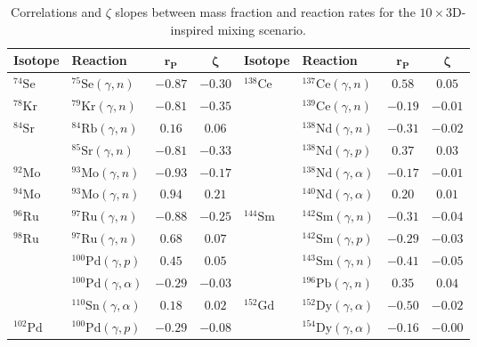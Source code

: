 \begin{table}
\caption{Correlations and $\zeta$ slopes between mass fraction and reaction rates for the $10\times$3D-inspired mixing scenario.
\label{tab:10x3d_corr}}
\scriptsize
    \begin{tabular}{llcc|llcc}
    \toprule
    \textbf{Isotope} & \textbf{Reaction} & $\mathbf{r_\mathrm{\mathbf{P}}}$ & $\mathbf{\zeta}$ & \textbf{Isotope} & \textbf{Reaction} & $\mathbf{r_\mathrm{\mathbf{P}}}$ & $\mathbf{\zeta}$\\
    \toprule
    $^{74}\mathrm{Se}$ & $^{75}\mathrm{Se}(\gamma,n)$ & $-0.87$ & $-0.30$ & $^{138}\mathrm{Ce}$ & $^{137}\mathrm{Ce}(\gamma,n)$ & $0.58$ & $0.05$ \\ 
    $^{78}\mathrm{Kr}$ & $^{79}\mathrm{Kr}(\gamma,n)$ & $-0.81$ & $-0.35$ & $ $ & $^{139}\mathrm{Ce}(\gamma,n)$ & $-0.19$ & $-0.01$ \\ 
    $^{84}\mathrm{Sr}$ & $^{84}\mathrm{Rb}(\gamma,n)$ & $0.16$ & $0.06$ & $ $ & $^{138}\mathrm{Nd}(\gamma,n)$ & $-0.31$ & $-0.02$ \\ 
    $ $ & $^{85}\mathrm{Sr}(\gamma,n)$ & $-0.81$ & $-0.33$ & $ $ & $^{138}\mathrm{Nd}(\gamma,p)$ & $0.37$ & $0.03$ \\ 
    $^{92}\mathrm{Mo}$ & $^{93}\mathrm{Mo}(\gamma,n)$ & $-0.93$ & $-0.17$ & $ $ & $^{138}\mathrm{Nd}(\gamma,\alpha)$ & $-0.17$ & $-0.01$ \\ 
    $^{94}\mathrm{Mo}$ & $^{93}\mathrm{Mo}(\gamma,n)$ & $0.94$ & $0.21$ & $ $ & $^{140}\mathrm{Nd}(\gamma,\alpha)$ & $0.20$ & $0.01$ \\ 
    $^{96}\mathrm{Ru}$ & $^{97}\mathrm{Ru}(\gamma,n)$ & $-0.88$ & $-0.25$ & $^{144}\mathrm{Sm}$ & $^{142}\mathrm{Sm}(\gamma,n)$ & $-0.31$ & $-0.04$ \\ 
    $^{98}\mathrm{Ru}$ & $^{97}\mathrm{Ru}(\gamma,n)$ & $0.68$ & $0.07$ & $ $ & $^{142}\mathrm{Sm}(\gamma,p)$ & $-0.29$ & $-0.03$ \\ 
    $ $ & $^{100}\mathrm{Pd}(\gamma,p)$ & $0.45$ & $0.05$ & $ $ & $^{143}\mathrm{Sm}(\gamma,n)$ & $-0.41$ & $-0.05$ \\ 
    $ $ & $^{100}\mathrm{Pd}(\gamma,\alpha)$ & $-0.29$ & $-0.03$ & $ $ & $^{196}\mathrm{Pb}(\gamma,n)$ & $0.35$ & $0.04$ \\ 
    $ $ & $^{110}\mathrm{Sn}(\gamma,\alpha)$ & $0.18$ & $0.02$ & $^{152}\mathrm{Gd}$ & $^{152}\mathrm{Dy}(\gamma,\alpha)$ & $-0.50$ & $-0.02$ \\ 
    $^{102}\mathrm{Pd}$ & $^{100}\mathrm{Pd}(\gamma,p)$ & $-0.29$ & $-0.08$ & $ $ & $^{154}\mathrm{Dy}(\gamma,\alpha)$ & $-0.16$ & $-0.00$ \\ 

\end{tabular}
\end{table}
